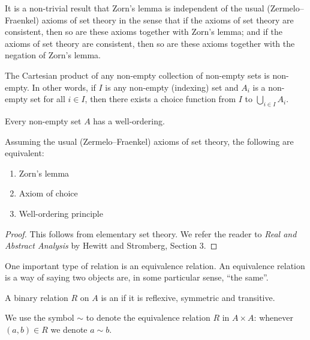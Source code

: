 It is a non-trivial result that Zorn's lemma is independent of the usual (Zermelo--Fraenkel) axioms of set theory in the sense that if the axioms of set theory are consistent, then so are these axioms together with Zorn's lemma; and if the axioms of set theory are consistent, then so are these axioms together with the negation of Zorn's lemma.

\begin{lemma}
The Cartesian product of any non-empty collection of non-empty sets is non-empty. In other words, if $I$ is any non-empty (indexing) set and $A_i$ is a non-empty set for all $i\in I$, then there exists a choice function from $I$ to $\bigcup_{i\in I}A_i$.
\end{lemma}

\begin{lemma}
Every non-empty set $A$ has a well-ordering.
\end{lemma}

\begin{theorem}
Assuming the usual (Zermelo--Fraenkel) axioms of set theory, the following are equivalent:
\begin{enumerate}[label=(\roman*)]
\item Zorn's lemma
\item Axiom of choice
\item Well-ordering principle
\end{enumerate}
\end{theorem}

\begin{proof}
This follows from elementary set theory. We refer the reader to \textit{Real and Abstract Analysis} by Hewitt and Stromberg, Section 3.
\end{proof}

One important type of relation is an equivalence relation. An equivalence relation is a way of saying two objects are, in some particular sense, ``the same''.

\begin{definition}
A binary relation $R$ on $A$ is an  if it is reflexive, symmetric and transitive.
\end{definition}

\begin{notation}
We use the symbol $\sim$ to denote the equivalence relation $R$ in $A \times A$: whenever $(a,b)\in R$ we denote $a \sim b$.
\end{notation}

